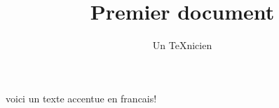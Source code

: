 \documentclass{article}
\title{Premier document}
\author{Un TeXnicien}
\date{}
\begin{document}
\maketitle

voici un texte accentue en francais!
\end{document}
